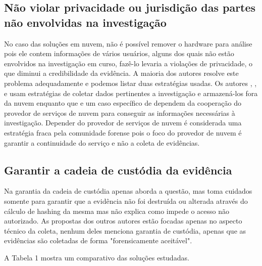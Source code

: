 \documentclass[conference]{IEEEtran}
\begin{document}
\subsection{Não violar privacidade ou jurisdição das partes não envolvidas na investigação}

No caso das soluções em nuvem, não é possível remover o hardware para análise pois ele contem informações de vários usuários, alguns dos quais não estão envolvidos na investigação em curso, fazê-lo levaria a violações de privacidade, o que diminui a credibilidade da evidência. 
%
A maioria dos autores resolve este problema adequadamente e podemos listar duas estratégias usadas. 
%
Os autores \cite{Reichert_Auto_acquisition:2015}, \cite{George_DF2CE:2012}, \cite{Poisel_VMI:2013} e \cite{Dykstra_FROST:2013} usam estratégias de coletar dados pertinentes a investigação e armazená-los fora da nuvem enquanto que \cite{Sang_Log_approach:2013} e um caso específico de \cite{George_DF2CE:2012} dependem da cooperação do provedor de serviços de nuvem para conseguir as informações necessárias à investigação. 
%
Depender do provedor de serviços de nuvem é considerada uma estratégia fraca pela comunidade forense pois o foco do provedor de nuvem é garantir a continuidade do serviço e não a coleta de evidências.

\subsection{Garantir a cadeia de custódia da evidência}

Na garantia da cadeia de custódia apenas \cite{Sang_Log_approach:2013} aborda a questão, mas toma cuidados somente para garantir que a evidência não foi destruída ou alterada através do cálculo de hashing da mesma mas não explica como impede o acesso não autorizado. 
%
As propostas dos outros autores estão focadas apenas no aspecto técnico da coleta, nenhum deles menciona garantia de custódia, apenas que as evidências são coletadas de forma "forensicamente aceitável".

A Tabela 1 mostra um comparativo das soluções estudadas.
\end{document}

